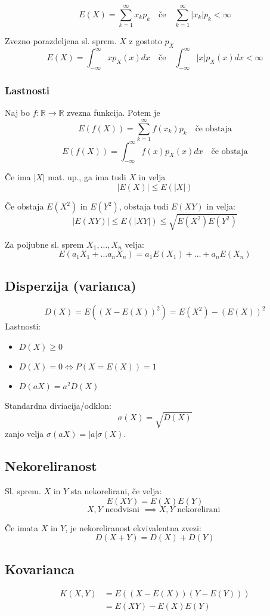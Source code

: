 \begin{multicols}{5}
\[ E(X) = \sum_{k=1}^\infty x_k p_k \quad \text{če} \quad \sum_{k=1}^\infty |x_k| p_k < \infty \]

Zvezno porazdeljena sl. sprem. $X$ z gostoto $p_X$
\[E(X) = \int_{-\infty}^{\infty} x p_X(x) dx \quad \text{če} \quad \int_{-\infty}^{\infty} |x| p_X(x) dx  < \infty\]

\subsubsection{Lastnosti}
Naj bo $f: \mathbb{R} \to \mathbb{R}$ zvezna funkcija. Potem je
\[ E(f(X)) = \sum_{k=1}^\infty f(x_k) p_k \quad \text{če obstaja}\]
\[ E(f(X)) = \int_{-\infty}^\infty f(x) p_X(x) dx \quad \text{če obstaja}\]

Če ima $|X|$ mat. up., ga ima tudi $X$ in velja 
\[|E(X)| \leq E(|X|) \]

Če obstaja $E(X^2)$ in $E(Y^2)$, obstaja tudi $E(XY)$ in velja:
\[|E(XY)| \leq E(|XY|) \leq \sqrt{E(X^2)E(Y^2)} \]

Za poljubne sl. sprem $X_1, \dots, X_n$ velja:
\[ E(a_1 X_1 + \dots a_n X_n) = a_1 E(X_1) + \dots + a_n E(X_n) \]

\subsection{Disperzija (varianca)}
\[D(X) = E((X - E(X))^2) = E(X^2) - (E(X))^2\]
Lastnosti: 
\begin{itemize}
	\item $D(X) \geq 0$
	\item $D(X) = 0 \iff P(X = E(X)) = 1$
	\item $D(aX) = a^2 D(X)$
\end{itemize}

Standardna diviacija/odklon:
\[ \sigma(X) = \sqrt{D(X)} \]
zanjo velja $\sigma (aX) = |a|\sigma(X)$.


\subsection{Nekoreliranost}
Sl. sprem. $X$ in $Y$ sta nekorelirani, če velja:
\[ E(XY) = E(X)E(Y) \]
\[ X, Y \text{ neodvisni } \implies X,Y \text{ nekorelirani }\]

Če imata $X$ in $Y$, je nekoreliranost ekvivalentna zvezi:
\[ D(X+Y) = D(X) + D(Y)\]

\subsection{Kovarianca}
\begin{align*}
	K(X,Y) &= E((X-E(X))(Y-E(Y))) \\
	&= E(XY)-E(X)E(Y)
\end{align*}


\end{multicols}
